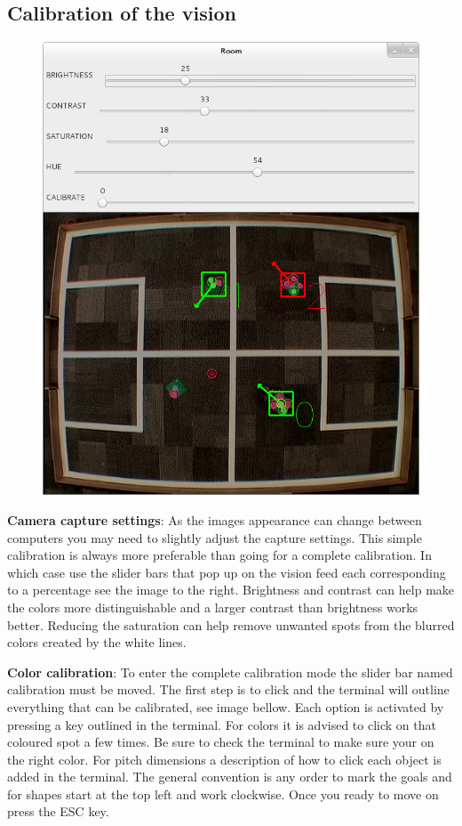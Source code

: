 \documentclass[a4paper,12pt]{article}
\begin{document}
\subsection{Calibration of the vision} \label{calibration}

\begin{figure}
\centering
\includegraphics[scale=0.25]{images/calibration1.png}
\end{figure} 
\textbf{Camera capture settings}: As the images appearance can change between computers you may need to slightly adjust the capture settings. This simple calibration is always more preferable than going for a complete calibration. In which case use the slider bars that pop up on the vision feed each corresponding to a percentage see the image to the right. Brightness and contrast can help make the colors more distinguishable and a larger contrast than brightness works better. Reducing the saturation can help remove unwanted spots from the blurred colors created by the white lines.   
 
\textbf{Color calibration}: To enter the complete calibration mode the slider bar named calibration must be moved. The first step is to click and the terminal will outline everything that can be calibrated, see image bellow. Each option is activated by pressing a key outlined in the terminal. For colors it is advised to click on that coloured spot a few times. Be sure to check the terminal to make sure your on the right color. For pitch dimensions a description of how to click each object is added in the terminal. The general convention is any order to mark the goals and for shapes start at the top left and work clockwise. Once you ready to move on press the ESC key. 
\end{document}
